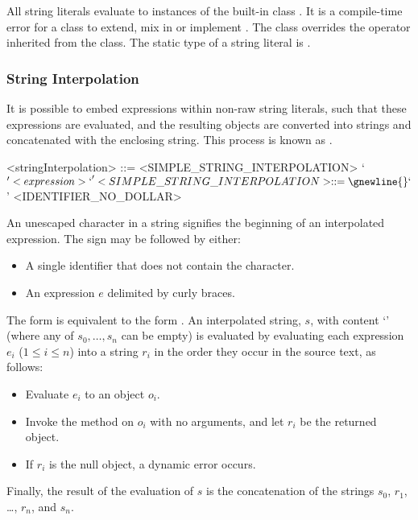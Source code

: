 \documentclass[makeidx]{article}
\begin{document}
{\LMHash{}%
All string literals evaluate to instances of the built-in class .
It is a compile-time error for a class to
extend, mix in or implement .
The  class overrides the \lit{==} operator inherited from
the  class.
The static type of a string literal is .


\subsubsection{String Interpolation}

\LMHash{}%
It is possible to embed expressions within non-raw string literals,
such that these expressions are evaluated,
and the resulting objects are converted into strings and
concatenated with the enclosing string.
This process is known as .

\begin{grammar}
<stringInterpolation> ::= <SIMPLE\_STRING\_INTERPOLATION>
  \alt `${' <expression> `}'

<SIMPLE\_STRING\_INTERPOLATION> ::= \gnewline{}
  `$' <IDENTIFIER\_NO\_DOLLAR>
\end{grammar}


\LMHash{}%
An unescaped \lit{\$} character in a string signifies
the beginning of an interpolated expression.
The \lit{\$} sign may be followed by either:
\begin{itemize}
\item A single identifier \id{} that does not contain the \lit{\$} character.
\item An expression $e$ delimited by curly braces.
\end{itemize}

\LMHash{}%
The form \code{\$\id} is equivalent to the form \code{\$\{\id\}}.
An interpolated string, $s$, with content
`'
(where any of $s_0, \ldots, s_n$ can be empty)
is evaluated by evaluating each expression $e_i$ ($1 \le i \le n$)
into a string $r_i$ in the order they occur in the source text, as follows:
\begin{itemize}
\item Evaluate $e_i$ to an object $o_i$.
\item Invoke the  method on $o_i$ with no arguments,
  and let $r_i$ be the returned object.
\item If $r_i$ is the null object, a dynamic error occurs.
\end{itemize}
Finally, the result of the evaluation of $s$ is
the concatenation of the strings $s_0$, $r_1$, \ldots, $r_n$, and $s_n$.


}
\end{document}
